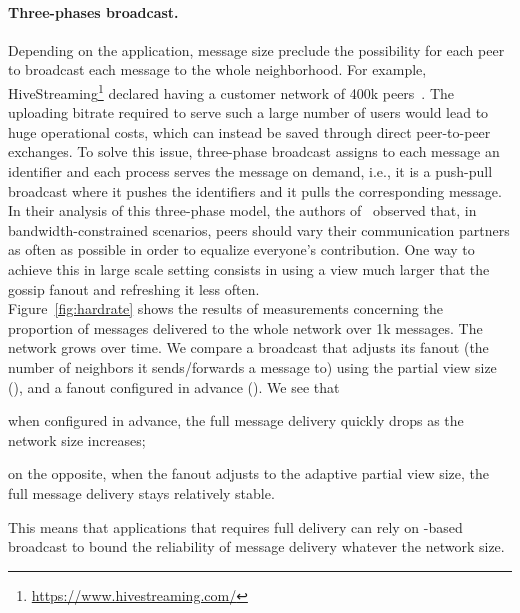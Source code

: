 \paragraph{Three-phases broadcast.} Depending on the application, message size
preclude the possibility for each peer to broadcast each message to the whole
neighborhood. For example,
HiveStreaming\footnote{\url{https://www.hivestreaming.com/}} declared having a
customer network of 400k peers~\cite{smoothcache2}. The uploading bitrate
required to serve such a large number of users would lead to huge operational
costs, which can instead be saved through direct peer-to-peer exchanges.  To
solve this issue, three-phase broadcast assigns to each message an identifier
and each process serves the message on demand, i.e., it is a push-pull broadcast
where it pushes the identifiers and it pulls the corresponding message. In their
analysis of this three-phase model, the authors of~\cite{Frey09DSN} observed
that, in bandwidth-constrained scenarios, peers should vary their communication
partners as often as possible in order to equalize everyone's contribution. One
way to achieve this in large scale setting consists in using a view much larger
that the gossip fanout and refreshing it less often. \\
Figure~\ref{fig:hardrate} shows the results of measurements concerning the
proportion of messages delivered to the whole network over 1k messages. The
network grows over time. We compare a broadcast that adjusts its fanout (the
number of neighbors it sends/forwards a message to) using the partial view size
(\SPRAY), and a fanout configured in advance (\CYCLON). We see that
\begin{inparaenum}
\item when configured in advance, the full message delivery quickly drops as the
  network size increases; 
\item on the opposite, when the fanout adjusts to the adaptive partial view
  size, the full message delivery stays relatively stable.
\end{inparaenum}
This means that applications that requires full delivery can rely on
\SPRAY-based broadcast to bound the reliability of message delivery whatever the
network size.


